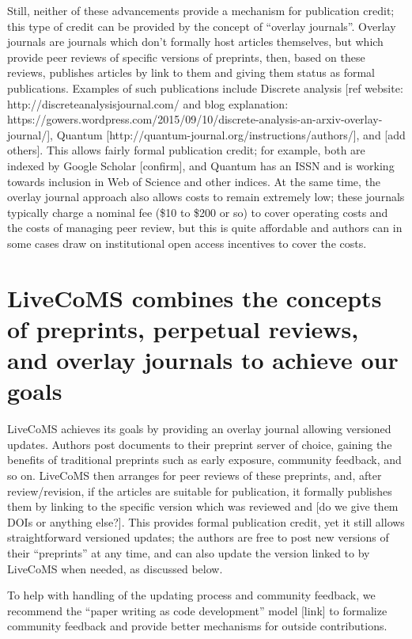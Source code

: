 \documentclass[9pt,lineno]{livecoms}
\begin{document}
Still, neither of these advancements provide a mechanism for publication credit; this type of credit can be provided by the concept of ``overlay journals''.
Overlay journals are journals which don't formally host articles themselves, but which provide peer reviews of specific versions of preprints, then, based on these reviews, publishes articles by link to them and giving them status as formal publications.
Examples of such publications include Discrete analysis [ref website: http://discreteanalysisjournal.com/ and blog explanation: https://gowers.wordpress.com/2015/09/10/discrete-analysis-an-arxiv-overlay-journal/], Quantum [http://quantum-journal.org/instructions/authors/], and  [add others].
This allows fairly formal publication credit; for example, both are indexed by Google Scholar [confirm], and Quantum has an ISSN and is working towards inclusion in Web of Science and other indices. 
At the same time, the overlay journal approach also allows costs to remain extremely low; these journals typically charge a nominal fee (\$10 to \$200 or so) to cover operating costs and the costs of managing peer review, but this is quite affordable and authors can in some cases draw on institutional open access incentives to cover the costs. 

\section{LiveCoMS combines the concepts of preprints, perpetual reviews, and overlay journals to achieve our goals}

LiveCoMS achieves its goals by providing an overlay journal allowing versioned updates.
Authors post documents to their preprint server of choice, gaining the benefits of traditional preprints such as early exposure, community feedback, and so on. 
LiveCoMS then arranges for peer reviews of these preprints, and, after review/revision, if the articles are suitable for publication, it formally publishes them by linking to the specific version which was reviewed and [do we give them DOIs or anything else?].
This provides formal publication credit, yet it still allows straightforward versioned updates; the authors are free to post new versions of their ``preprints'' at any time, and can also update the version linked to by LiveCoMS when needed, as discussed below.

To help with handling of the updating process and community feedback, we recommend the ``paper writing as code development'' model [link] to formalize community feedback and provide better mechanisms for outside contributions. 
\end{document}
